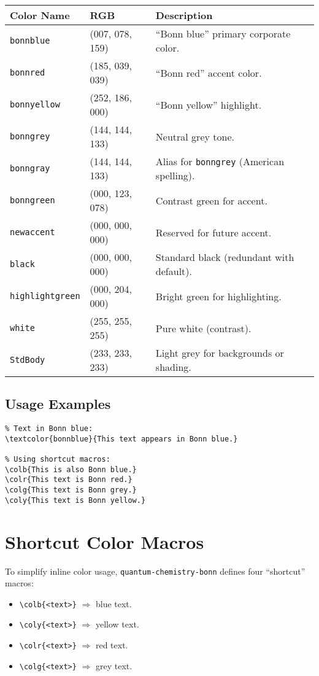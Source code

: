 \documentclass[a4paper,12pt]{article}
\begin{document}
\bigskip
\begin{tabular}{@{}llp{8cm}@{}}
\textbf{Color Name}     & \textbf{RGB}        & \textbf{Description} \\
\midrule
\texttt{bonnblue}       & (007, 078, 159)        & “Bonn blue” primary corporate color. \\
\texttt{bonnred}        & (185, 039, 039)       & “Bonn red” accent color. \\
\texttt{bonnyellow}     & (252, 186, 000)       & “Bonn yellow” highlight. \\
\texttt{bonngrey}       & (144, 144, 133)     & Neutral grey tone. \\
\texttt{bonngray}       & (144, 144, 133)     & Alias for \texttt{bonngrey} (American spelling). \\
\texttt{bonngreen}      & (000, 123, 078)        & Contrast green for accent. \\
\midrule
\texttt{newaccent}      & (000, 000, 000)           & Reserved for future accent. \\
\texttt{black}          & (000, 000, 000)           & Standard black (redundant with default). \\
\texttt{highlightgreen} & (000, 204, 000)         & Bright green for highlighting. \\
\texttt{white}          & (255, 255, 255)     & Pure white (contrast). \\
\texttt{StdBody}        & (233, 233, 233)     & Light grey for backgrounds or shading. \\
\end{tabular}

\bigskip
\subsection{Usage Examples}
\begin{verbatim}
% Text in Bonn blue:
\textcolor{bonnblue}{This text appears in Bonn blue.}

% Using shortcut macros:
\colb{This is also Bonn blue.}
\colr{This text is Bonn red.}
\colg{This text is Bonn grey.}
\coly{This text is Bonn yellow.}
\end{verbatim}

\section{Shortcut Color Macros}
\label{sec:shortcuts}
To simplify inline color usage, \texttt{quantum-chemistry-bonn} defines four “shortcut” macros:
\begin{itemize}
  \item \verb|\colb{<text>}|  $\Rightarrow$ \textcolor{bonnblue}{blue} text.
  \item \verb|\coly{<text>}|  $\Rightarrow$ \textcolor{bonnyellow}{yellow} text.
  \item \verb|\colr{<text>}|  $\Rightarrow$ \textcolor{bonnred}{red} text.
  \item \verb|\colg{<text>}|  $\Rightarrow$ \textcolor{bonngrey}{grey} text.
\end{itemize}
\end{document}
